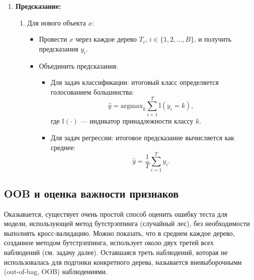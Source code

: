 \begin{enumerate}
    \item \textbf{Предсказание:}
          \begin{enumerate}
              \item Для нового объекта \(x\):
                    \begin{itemize}
                        \item Провести \(x\) через каждое дерево \(T_i\), \(i \in \{1, 2, \dots, B\}\), и получить предсказания \(y_i\).
                        \item Объединить предсказания:
                              \begin{itemize}
                                  \item Для задач классификации: итоговый класс определяется голосованием большинства:
                                        \[
                                            \hat{y} = \text{argmax}_k \sum_{i=1}^T \mathbb{I}(y_i = k),
                                        \]
                                        где \(\mathbb{I}(\cdot)\) — индикатор принадлежности классу \(k\).
                                  \item Для задач регрессии: итоговое предсказание вычисляется как среднее:
                                        \[
                                            \hat{y} = \frac{1}{T} \sum_{i=1}^T y_i.
                                        \]
                              \end{itemize}
                    \end{itemize}
          \end{enumerate}
\end{enumerate}


\subsection*{OOB и оценка важности признаков}
Оказывается, существует очень простой способ оценить ошибку теста для модели, использующей метод бутстрэппинга (случайный лес), без необходимости выполнять кросс-валидацию. Можно показать, что в среднем каждое дерево, созданное методом бутстрэппинга, использует около двух третей всех наблюдений (см. задачу далее). Оставшаяся треть наблюдений, которая не использовалась для подгонки конкретного дерева, называется вневыборочными (out-of-bag, OOB) наблюдениями.


